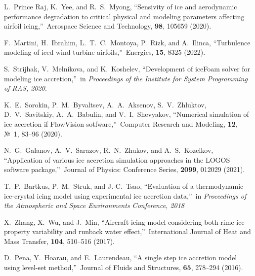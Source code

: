 \documentclass[
11pt,%
tightenlines,%
twoside,%
onecolumn,%
nofloats,%
nobibnotes,%
nofootinbib,%
superscriptaddress,%
noshowpacs,%
centertags]%
{revtex4}
\begin{document}
\begin{thebibliography}{99}


L.~Prince Raj, K.~Yee, and R.~S.~Myong, \textquotedblleft Sensivity of ice and aerodynamic performance degradation to critical physical and modeling parameters affecting airfoil icing,\textquotedblright \ Aerospace Science and Technology, {\bf 98}, 105659 (2020).

F.~Martini, H.~Ibrahim, L.~T.~C.~Montoya, P.~Rizk, and A.~Ilinca, \textquotedblleft Turbulence modeling of iced wind turbine airfoils,\textquotedblright \ Energies, {\bf 15}, 8325 (2022).

S.~Strijhak, V.~Melnikova, and K.~Koshelev, \textquotedblleft Development of iceFoam solver for modeling ice accretion,\textquotedblright \ in \textit{Proceedings of the Institute for System Programming of RAS, 2020}.

K.~E.~Sorokin, P.~M.~Byvaltsev, A.~A.~Aksenov, S.~V.~Zhluktov, D.~V.~Savitskiy, A.~A.~Babulin, and V.~I.~Shevyakov, \textquotedblleft Numerical simulation of ice accretion if FlowVision sotfware,\textquotedblright \ Computer Research and Modeling, {\bf 12}, №~1, 83--96 (2020).

N.~G.~Galanov, A.~V.~Sarazov, R.~N.~Zhukov, and A.~S.~Kozelkov, \textquotedblleft Application of various ice accretion simulation approaches in the LOGOS software package,\textquotedblright \ Journal of Physics: Conference Series, {\bf 2099}, 012029 (2021).

T.~P.~Bartkus, P.~M.~Struk, and J.-C.~Tsao, \textquotedblleft Evaluation of a thermodynamic ice-crystal icing model using experimental ice accretion data,\textquotedblright \ in \textit{Proceedings of the Atmospheric and Space Environments Conference, 2018}

X.~Zhang, X.~Wu, and J.~Min, \textquotedblleft Aircraft icing model considering both rime ice property variability and runback water effect,\textquotedblright \ International Journal of Heat and Mass Transfer, {\bf 104}, 510--516 (2017).

D.~Pena, Y.~Hoarau, and E.~Laurendeau, \textquotedblleft A single step ice accretion model using level-set method,\textquotedblright \ Journal of Fluids and Structures, {\bf 65}, 278--294 (2016).



\end{thebibliography}
\end{document}
